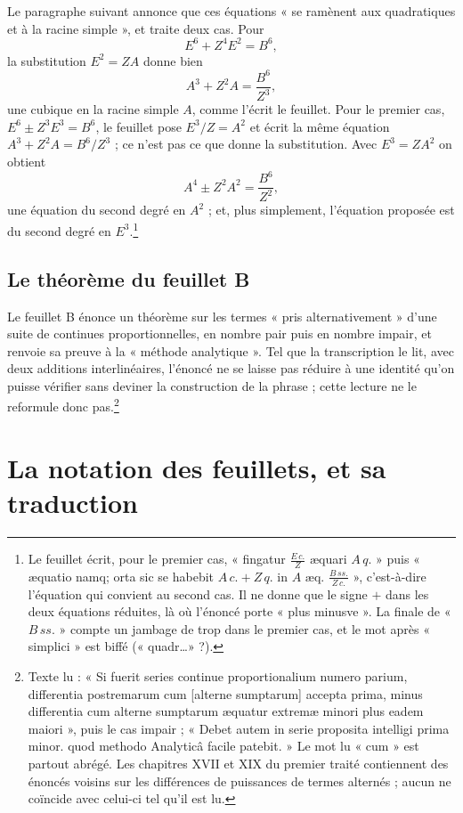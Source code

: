 \documentclass[11pt,a4paper]{article}
\begin{document}
Le paragraphe suivant annonce que ces équations « se ramènent aux quadratiques
et à la racine simple », et traite deux cas. Pour
\[ E^6 + Z^4E^2 = B^6 , \]
la substitution $E^2 = ZA$ donne bien
\[ A^3 + Z^2 A = \frac{B^6}{Z^3}, \]
une cubique en la racine simple $A$, comme l'écrit le feuillet. Pour le premier
cas, $E^6 \pm Z^3E^3 = B^6$, le feuillet pose $E^3/Z = A^2$ et écrit la même
équation $A^3 + Z^2A = B^6/Z^3$ ; ce n'est pas ce que donne la substitution.
Avec $E^3 = ZA^2$ on obtient
\[ A^4 \pm Z^2A^2 = \frac{B^6}{Z^2}, \]
une équation du second degré en $A^2$ ; et, plus simplement, l'équation
proposée est du second degré en $E^3$.\footnote{Le feuillet écrit, pour le
premier cas, « fingatur $\frac{E\,c.}{Z}$ æquari $A\,q.$ » puis « æquatio namq;
orta sic se habebit $A\,c. + Z\,q.$ in $A$ æq. $\frac{B\,ss.}{Z\,c.}$ », c'est-à-dire
l'équation qui convient au second cas. Il ne donne que le signe $+$ dans les
deux équations réduites, là où l'énoncé porte « plus minusve ». La finale de
« $B\,ss.$ » compte un jambage de trop dans le premier cas, et le mot après
« simplici » est biffé (« quadr\ldots » ?).}

\subsection*{Le théorème du feuillet B}

Le feuillet B énonce un théorème sur les termes « pris alternativement » d'une
suite de continues proportionnelles, en nombre pair puis en nombre impair, et
renvoie sa preuve à la « méthode analytique ». Tel que la transcription le lit,
avec deux additions interlinéaires, l'énoncé ne se laisse pas réduire à une
identité qu'on puisse vérifier sans deviner la construction de la phrase ; cette
lecture ne le reformule donc pas.\footnote{Texte lu : « Si fuerit series
continue proportionalium numero parium, differentia postremarum cum [alterne
sumptarum] accepta prima, minus differentia cum alterne sumptarum æquatur
extremæ minori plus eadem maiori », puis le cas impair ; « Debet autem in serie
proposita intelligi prima minor. quod methodo Analyticâ facile patebit. » Le mot
lu « cum » est partout abrégé. Les chapitres XVII et XIX du premier traité
contiennent des énoncés voisins sur les différences de puissances de termes
alternés ; aucun ne coïncide avec celui-ci tel qu'il est lu.}

\section*{La notation des feuillets, et sa traduction}
\end{document}
